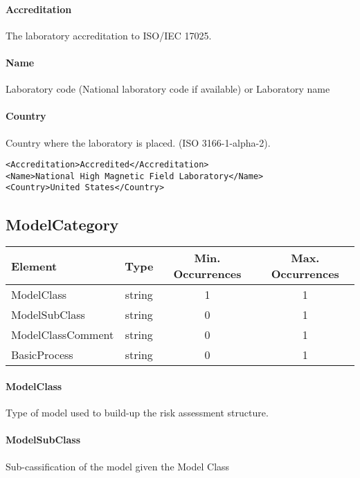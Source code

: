 \documentclass[a4paper]{report}
\begin{document}
\paragraph{Accreditation}
The laboratory accreditation to ISO/IEC 17025.

\paragraph{Name}
Laboratory code (National laboratory code if available) or Laboratory name 

\paragraph{Country}
Country where the laboratory is placed. (ISO 3166-1-alpha-2).

\begin{lstlisting}[basicstyle=\footnotesize, caption={Example of Laboratory}]
<Accreditation>Accredited</Accreditation>
<Name>National High Magnetic Field Laboratory</Name>
<Country>United States</Country>
\end{lstlisting}   

\subsection{ModelCategory}

\begin{tabular}{|l|c|c|c|}
    \hline
    \textbf{Element} & \textbf{Type} & \textbf{Min. Occurrences} & \textbf{Max. Occurrences} \\
    \hline
    ModelClass & string & 1 & 1 \\
    ModelSubClass & string & 0 & 1 \\
    ModelClassComment & string & 0 & 1 \\
    BasicProcess & string & 0 & 1 \\
    \hline
\end{tabular}

\paragraph{ModelClass}
Type of model used to build-up the risk assessment structure.

\paragraph{ModelSubClass}
Sub-cassification of the model given the Model Class
\end{document}
